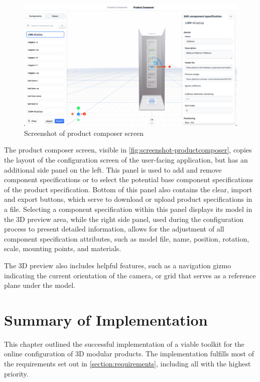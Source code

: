 \begin{figure}[h!]
\centering
\includegraphics[width=\textwidth]{images/screenshot_productcomposer.png}
\caption{Screenshot of product composer screen}
\label{fig:screenshot-productcomposer}
\end{figure}

The product composer screen, visible in \autoref{fig:screenshot-productcomposer}, copies the layout of the configuration screen of the user-facing application, but has an additional side panel on the left. This panel is used to add and remove component specifications or to select the potential base component specifications of the product specification. Bottom of this panel also contains the clear, import and export buttons, which serve to download or upload product specifications in a  file. Selecting a component specification within this panel displays its model in the 3D preview area, while the right side panel, used during the configuration process to present detailed information, allows for the adjustment of all component specification attributes, such as model file, name, position, rotation, scale, mounting points, and materials.

The 3D preview also includes helpful features, such as a navigation gizmo indicating the current orientation of the camera, or grid that serves as a reference plane under the model.


\section{Summary of Implementation} \label{section:requirmenets-evaulation}

This chapter outlined the successful implementation of a viable toolkit for the online configuration of 3D modular products. The implementation fulfills most of the requirements set out in \autoref{section:requirements}, including all with the highest priority.

